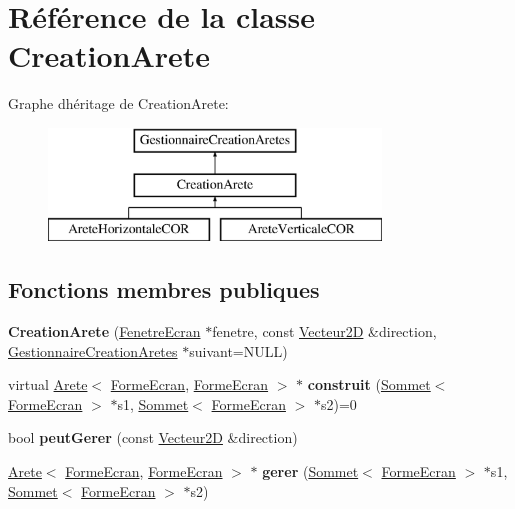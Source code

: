 \hypertarget{class_creation_arete}{}\section{Référence de la classe Creation\+Arete}
\label{class_creation_arete}
Graphe d\textquotesingle{}héritage de Creation\+Arete\+:\begin{figure}[H]
\begin{center}
\leavevmode
\includegraphics[height=3.000000cm]{class_creation_arete}
\end{center}
\end{figure}
\subsection*{Fonctions membres publiques}
\begin{DoxyCompactItemize}
\item 
\mbox{\label{class_creation_arete_ac3676b415504a9b0f2f3c3bc8274d59a}} 
{\bfseries Creation\+Arete} (\mbox{\hyperlink{class_fenetre_ecran}{Fenetre\+Ecran}} $\ast$fenetre, const \mbox{\hyperlink{class_vecteur2_d}{Vecteur2D}} \&direction, \mbox{\hyperlink{class_gestionnaire_creation_aretes}{Gestionnaire\+Creation\+Aretes}} $\ast$suivant=N\+U\+LL)
\item 
\mbox{\label{class_creation_arete_afb89f92f1f8b07c735f95fa5ecb931b7}} 
virtual \mbox{\hyperlink{class_arete}{Arete}}$<$ \mbox{\hyperlink{class_forme_ecran}{Forme\+Ecran}}, \mbox{\hyperlink{class_forme_ecran}{Forme\+Ecran}} $>$ $\ast$ {\bfseries construit} (\mbox{\hyperlink{class_sommet}{Sommet}}$<$ \mbox{\hyperlink{class_forme_ecran}{Forme\+Ecran}} $>$ $\ast$s1, \mbox{\hyperlink{class_sommet}{Sommet}}$<$ \mbox{\hyperlink{class_forme_ecran}{Forme\+Ecran}} $>$ $\ast$s2)=0
\item 
\mbox{\label{class_creation_arete_a2b17ecc798967efd1d83e16d1b95d9ef}} 
bool {\bfseries peut\+Gerer} (const \mbox{\hyperlink{class_vecteur2_d}{Vecteur2D}} \&direction)
\item 
\mbox{\label{class_creation_arete_a968081fcf4aed50e8d00d7ce27a74738}} 
\mbox{\hyperlink{class_arete}{Arete}}$<$ \mbox{\hyperlink{class_forme_ecran}{Forme\+Ecran}}, \mbox{\hyperlink{class_forme_ecran}{Forme\+Ecran}} $>$ $\ast$ {\bfseries gerer} (\mbox{\hyperlink{class_sommet}{Sommet}}$<$ \mbox{\hyperlink{class_forme_ecran}{Forme\+Ecran}} $>$ $\ast$s1, \mbox{\hyperlink{class_sommet}{Sommet}}$<$ \mbox{\hyperlink{class_forme_ecran}{Forme\+Ecran}} $>$ $\ast$s2)
\end{DoxyCompactItemize}
